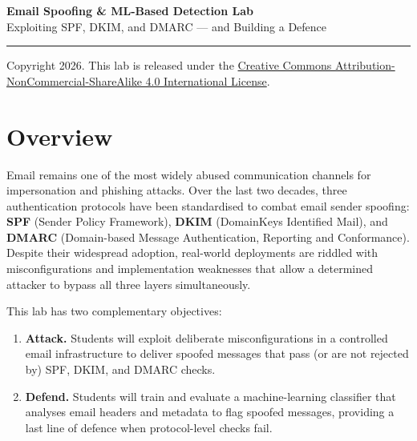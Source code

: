 \documentclass[11pt]{article}
\begin{document}

\begin{center}
  {\LARGE\bfseries Email Spoofing \& ML-Based Detection Lab}\\[6pt]
  {\large Exploiting SPF, DKIM, and DMARC --- and Building a Defence}
\end{center}

\vspace{4pt}
\noindent\rule{\linewidth}{0.6pt}
\vspace{4pt}

\noindent
Copyright \textcopyright{} 2026.
This lab is released under the
\href{http://creativecommons.org/licenses/by-nc-sa/4.0/}{Creative
Commons Attribution-NonCommercial-ShareAlike 4.0 International License}.

\vspace{8pt}

\section{Overview}

Email remains one of the most widely abused communication channels for
impersonation and phishing attacks.
Over the last two decades, three authentication protocols have been
standardised to combat email sender spoofing:
\textbf{SPF} (Sender Policy Framework),
\textbf{DKIM} (DomainKeys Identified Mail), and
\textbf{DMARC} (Domain-based Message Authentication, Reporting and
Conformance).
Despite their widespread adoption, real-world deployments are riddled
with misconfigurations and implementation weaknesses that allow a
determined attacker to bypass all three layers simultaneously.

This lab has two complementary objectives:

\begin{enumerate}[noitemsep]
  \item \textbf{Attack.} Students will exploit deliberate
    misconfigurations in a controlled email infrastructure to deliver
    spoofed messages that pass (or are not rejected by) SPF, DKIM, and
    DMARC checks.
  \item \textbf{Defend.} Students will train and evaluate a
    machine-learning classifier that analyses email headers and metadata
    to flag spoofed messages, providing a last line of defence when
    protocol-level checks fail.
\end{enumerate}
\end{document}
